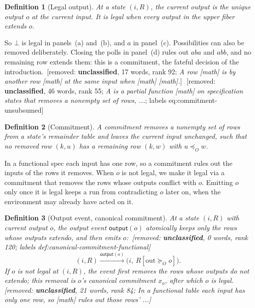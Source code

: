 \documentclass[sigconf]{cidr-2027}
\newtheorem{definition}{Definition}
\theoremstyle{remark}
\newcommand{\OutputOrd}{\preceq_O}
\newcommand{\OutputGe}{\succeq_O}
\newcommand{\commitment}{commitment\xspace}
\newcommand{\Commitment}{Commitment\xspace}
\newcommand{\outrel}{extends\xspace}          %
\newcommand{\outrelbase}{extend\xspace}       %
\newif\ifshowrv \showrvfalse
\newcommand{\rv}[1]{\ifshowrv\textsuperscript{\textcolor{magenta}{\textbf{R#1}}}\fi}
\newcommand{\removednote}[1]{{\color{cutred}\footnotesize\,[removed: #1]\,}}
\begin{document}
\begin{definition}[Legal output]
\label{def:exposable}
\textcolor{newblue}{At a state $(i,R)$, the \emph{current output} is the unique output $o$ at the
current input.} \textcolor{newblue}{It is \emph{legal} when every output in the upper fiber \outrel
$o$.}
\end{definition}

So $\bot$ is legal in panels~(a) and~(b), and $a$ in panel~(c). Possibilities
can also be removed deliberately. \textcolor{newblue}{Closing the polls in panel~(d) rules out
$aba$ and $abb$, and no remaining row \outrel them: this is a \commitment, the
fateful decision of the introduction.\rv{5}} \removednote{\textbf{unclassified}, 17 words, rank 92; \textit{A row [math] is by another row [math] at the same input when [math] [math].}} \removednote{\textbf{unclassified}, 46 words, rank 55; \textit{A is a partial function [math] on specification states that removes a nonempty set of rows, ...}; labels eq:commitment-unsubsumed}

\begin{definition}[\Commitment]
\label{def:commitment}
\textcolor{newblue}{A \emph{\commitment} removes a nonempty set of rows from a state's remainder
table and leaves the current input unchanged, such that no removed row $(k,u)$
has a remaining row $(k,w)$ with $u\OutputOrd w$.}
\end{definition}

\textcolor{newblue}{In a functional spec each input has one row, so a \commitment rules out the
inputs of the rows it removes.} When $o$ is not legal, we make it legal via a \commitment
that removes the rows whose outputs conflict with $o$. Emitting $o$ only once it is legal keeps a run from
contradicting $o$ later on, when the environment may already have acted on it.

\begin{definition}[Output event, canonical \commitment]
\label{def:output-event}
At a state $(i,R)$ with current output $o$, the \emph{output event}
$\mathsf{output}(o)$ atomically keeps only the rows whose outputs \outrelbase $o$,
and then emits $o$: \removednote{\textbf{unclassified}, 0 words, rank 120; labels def:canonical-commitment-functional}
\begin{equation}
  (i,R)\xrightarrow{\mathsf{output}(o)}\bigl(i,\ R[\mathrm{out}\OutputGe o]\bigr).
  \label{eq:output-action}
\end{equation}
\textcolor{newblue}{If $o$ is not legal at $(i,R)$, the event first removes the rows whose outputs
do not \outrelbase $o$; this removal is $o$'s \emph{canonical \commitment} $x_o$,
after which $o$ is legal.\rv{14}} \removednote{\textbf{unclassified}, 21 words, rank 84; \textit{In a functional table each input has only one row, so [math] rules out those rows' ...}}
\end{definition}
\end{document}
